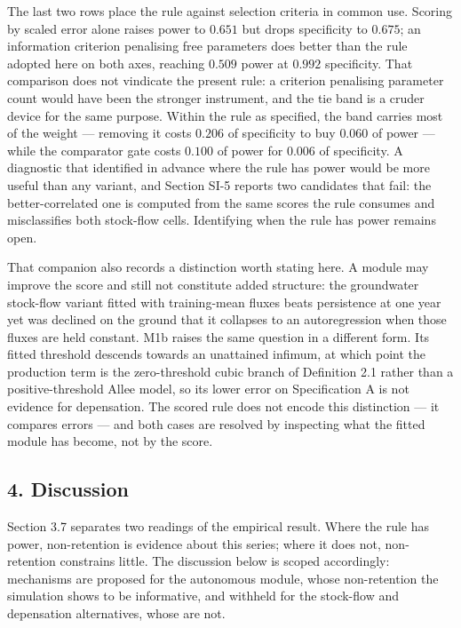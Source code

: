 \documentclass[11pt]{article}
\begin{document}
The last two rows place the rule against selection criteria in common
use. Scoring by scaled error alone raises power to \(0.651\) but drops
specificity to \(0.675\); an information criterion penalising free
parameters does better than the rule adopted here on both axes,
reaching \(0.509\) power at \(0.992\) specificity. That comparison does
not vindicate the present rule: a criterion penalising parameter count
would have been the stronger instrument, and the tie band is a cruder
device for the same purpose. Within the rule as specified, the band
carries most of the weight --- removing it costs \(0.206\) of
specificity to buy \(0.060\) of power --- while the comparator gate
costs \(0.100\) of power for \(0.006\) of specificity. A diagnostic that
identified in advance where the rule has power would be more useful
than any variant, and Section SI-5 reports two candidates that fail:
the better-correlated one is computed from the same scores the rule
consumes and misclassifies both stock-flow cells. Identifying when the
rule has power remains open.

That companion also records a distinction worth stating here. A module
may improve the score and still not constitute added structure: the
groundwater stock-flow variant fitted with training-mean fluxes beats
persistence at one year yet was declined on the ground that it collapses
to an autoregression when those fluxes are held constant. M1b raises the
same question in a different form. Its fitted threshold descends towards
an unattained infimum, at which point the production term is the
zero-threshold cubic branch of Definition 2.1 rather than a
positive-threshold Allee model, so its lower error on Specification A is
not evidence for depensation. The scored rule does not encode this
distinction --- it compares errors --- and both cases are resolved by
inspecting what the fitted module has become, not by the score.

\subsection{4. Discussion}\label{discussion}

Section 3.7 separates two readings of the empirical result. Where the
rule has power, non-retention is evidence about this series; where it
does not, non-retention constrains little. The discussion below is
scoped accordingly: mechanisms are proposed for the autonomous module,
whose non-retention the simulation shows to be informative, and withheld
for the stock-flow and depensation alternatives, whose are not.
\end{document}
